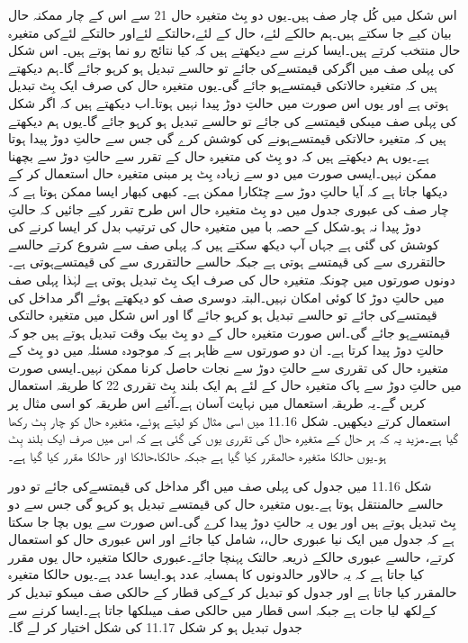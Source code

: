 	اس شکل میں کُل چار صف ہیں۔یوں دو بِٹ متغیرہ حال 21 سے اس کے چار ممکنہ حال بیان کیے جا سکتے ہیں۔ہم حالکے لئے، حال کے لئے،حالتکے لئےاور حالتکے لئےکی متغیرہ حال منتخب کرتے ہیں۔ایسا کرنے سے دیکھتے ہیں کہ کیا نتائج رو نما ہوتے ہیں۔
	اس شکل کی پہلی صف میں اگرکی قیمتسےکی جائے تو حالسے تبدیل ہو کرہو جائے گا۔ہم دیکھتے ہیں کہ متغیرہ حالاتکی قیمتسےہو جائے گی۔یوں متغیرہ حال کی صرف ایک بِٹ تبدیل ہوتی ہے اور یوں اس صورت میں حالتِ دوڑ پیدا نہیں ہوتا۔اب دیکھتے ہیں کہ اگر شکل کی پہلی صف میںکی قیمتسے کی جائے تو حالسے تبدیل ہو کرہو جائے گا۔یوں ہم دیکھتے ہیں کہ متغیرہ حالاتکی قیمتسےہونے کی کوشش کرے گی جس سے حالتِ دوڑ پیدا ہوتا ہے۔یوں ہم دیکھتے ہیں کہ دو بِٹ کی متغیرہ حال کے تقرر سے حالتِ دوڑ سے بچھنا ممکن نہیں۔ایسی صورت میں دو سے زیادہ بِٹ پر مبنی متغیرہ حال استعمال کر کے دیکھا جاتا ہے کہ آیا حالتِ دوڑ سے چٹکارا ممکن ہے۔
	کبھی کبھار ایسا ممکن ہوتا ہے کہ چار صف کی عبوری جدول میں دو بِٹ متغیرہ حال اس طرح تقرر کیے جائیں کہ حالتِ دوڑ پیدا نہ ہو۔شکل کے حصہ با میں متغیرہ حال کی ترتیب بدل کر ایسا کرنے کی کوشش کی گئی ہے جہاں آپ دیکھ سکتے ہیں کہ پہلی صف سے شروع کرتے حالسے حالتقرری سے کی قیمتسے ہوتی ہے جبکہ حالسے حالتقرری سے کی قیمتسےہوتی ہے۔دونوں صورتوں میں چونکہ متغیرہ حال کی صرف ایک بِٹ تبدیل ہوتی ہے لہٰذا پہلی صف میں حالتِ دوڑ کا کوئی امکان نہیں۔البتہ دوسری صف کو دیکھتے ہوئے اگر مداخل کی قیمتسےکی جائے تو حالسے تبدیل ہو کرہو جائے گا اور اس شکل میں متغیرہ حالتکی قیمتسےہو جائے گی۔اس صورت متغیرہ حال کے دو بِٹ بیک وقت تبدیل ہوتے ہیں جو کہ حالتِ دوڑ پیدا کرتا ہے۔
	ان دو صورتوں سے ظاہر ہے کہ موجودہ مسئلہ میں دو بِٹ کے متغیرہ حال کی تقرری سے حالتِ دوڑ سے نجات حاصل کرنا ممکن نہیں۔ایسی صورت میں حالتِ دوڑ سے پاک متغیرہ حال کے لئے ہم ایک بلند بِٹ تقرری 22 کا طریقہ استعمال کریں گے۔یہ طریقہ استعمال میں نہایت آسان ہے۔آئیے اس طریقہ کو اسی مثال پر استعمال کرتے دیکھیں۔
	شکل 11.16 میں اسی مثال کو لیتے ہوئے، متغیرہ حال کو چار بِٹ رکھا گیا ہے۔مزید یہ کہ ہر حال کے متغیرہ حال کی تقرری یوں کی گئی ہے کہ اس میں صرف ایک بلند بِٹ ہو۔یوں حالکا متغیرہ حالمقرر کیا گیا ہے جبکہ حالکا،حالکا  اور حالکا مقرر کیا گیا ہے۔


	شکل 11.16 میں جدول کی پہلی صف میں اگر مداخل کی قیمتسےکی جائے تو دور حالسے حالمنتقل ہوتا ہے۔یوں متغیرہ حال کی قیمتسے تبدیل ہو کرہو گی جس سے دو بِٹ تبدیل ہوتے ہیں اور یوں یہ حالتِ دوڑ پیدا کرے گی۔اس صورت سے یوں بچا جا سکتا ہے کہ جدول میں ایک نیا عبوری حال،، شامل کیا جائے اور اس عبوری حال کو استعمال کرتے، حالسے عبوری حالکے ذریعہ حالتک پہنچا جائے۔عبوری حالکا متغیرہ حال یوں مقرر کیا جاتا ہے کہ یہ حالاور حالدونوں کا ہمسایہ عدد ہو۔ایسا عدد ہے۔یوں حالکا متغیرہ حالمقرر کیا جاتا ہے اور جدول کو تبدیل کر کےکی قطار کے حالکی صف میںکو تبدیل کر کےلکھ لیا جات ہے جبکہ اسی قطار میں حالکی صف میںلکھا جاتا ہے۔ایسا کرنے سے جدول تبدیل ہو کر شکل 11.17 کی شکل اختیار کر لے گا۔


